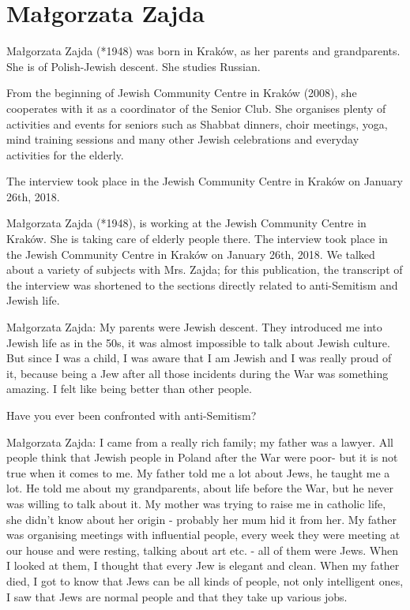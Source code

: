 \section{Małgorzata Zajda}

Małgorzata Zajda (*1948) was born in Kraków, as her parents and grandparents. She is of Polish-Jewish descent. She studies Russian.  

From the beginning of Jewish Community Centre in Kraków (2008), she cooperates with it as a coordinator of the Senior Club. She organises plenty of activities and events for seniors such as Shabbat dinners, choir meetings, yoga, mind training sessions and many other Jewish celebrations and everyday activities for the elderly.  

The interview took place in the Jewish Community Centre in Kraków on January 26th, 2018. 

Małgorzata Zajda (*1948), is working at the Jewish Community Centre in Kraków. She is taking care of elderly people there. 
The interview took place in the Jewish Community Centre in Kraków on January 26th, 2018. We talked about a variety of subjects with Mrs. Zajda; for this publication, the transcript of the interview was shortened to the sections directly related to anti-Semitism and Jewish life. 

Małgorzata Zajda: My parents were Jewish descent. They introduced me into Jewish life as in the 50s, it was almost impossible to talk about Jewish culture. But since I was a child, I was aware that I am Jewish and I was really proud of it, because being a Jew after all those incidents during the War was something amazing. I felt like being better than other people.  

Have you ever been confronted with anti-Semitism? 

Małgorzata Zajda: I came from a really rich family; my father was a lawyer. All people think that Jewish people in Poland after the War were poor- but it is not true when it comes to me. My father told me a lot about Jews, he taught me a lot. He told me about my grandparents, about life before the War, but he never was willing to talk about it. My mother was trying to raise me in catholic life, she didn't know about her origin - probably her mum hid it from her. My father was organising meetings with influential people, every week they were meeting at our house and were resting, talking about art etc. - all of them were Jews. When I looked at them, I thought that every Jew is elegant and clean. When my father died, I got to know that Jews can be all kinds of people, not only intelligent ones, I saw that Jews are normal people and that they take up various jobs. 

